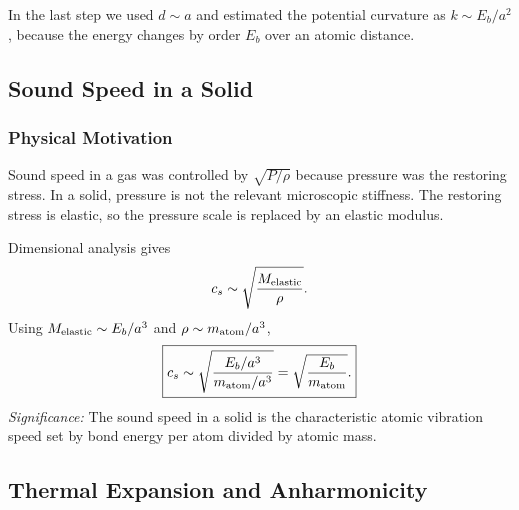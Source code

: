 In the last step we used $d\sim a$ and estimated the potential curvature as
$k\sim E_b/a^2$, because the energy changes by order $E_b$ over an atomic
distance.

\subsection{Sound Speed in a Solid}
\label{sec:lec11:sound-solid}

\subsubsection*{Physical Motivation}
Sound speed in a gas was controlled by $\sqrt{P/\rho}$ because pressure was the
restoring stress. In a solid, pressure is not the relevant microscopic stiffness.
The restoring stress is elastic, so the pressure scale is replaced by an
elastic modulus.

Dimensional analysis gives
\begin{equation}
    c_s\sim\sqrt{\frac{M_{\rm elastic}}{\rho}}.
    \label{eq:lec11:sound-solid-step}
\end{equation}
Using $M_{\rm elastic}\sim E_b/a^3$ and
$\rho\sim m_{\rm atom}/a^3$,
\begin{equation}
    \boxed{
    c_s\sim
    \sqrt{\frac{E_b/a^3}{m_{\rm atom}/a^3}}
    =
    \sqrt{\frac{E_b}{m_{\rm atom}}}.
    }
    \label{eq:lec11:sound-solid}
\end{equation}
\textit{Significance:} The sound speed in a solid is the characteristic atomic
vibration speed set by bond energy per atom divided by atomic mass.


\subsection{Thermal Expansion and Anharmonicity}
\label{sec:lec11:thermal-expansion}

